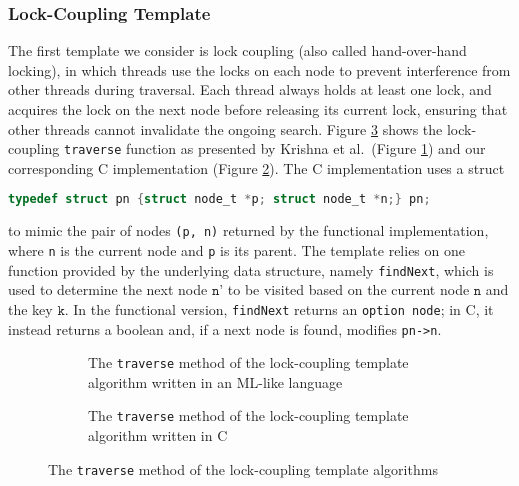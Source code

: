\documentclass[a4paper,UKenglish,cleveref, autoref, thm-restate]{lipics-v2021}
\begin{document}
\subsubsection{Lock-Coupling Template}
\label{lock-coupling-algo}

The first template we consider is lock coupling (also called hand-over-hand locking), in which threads use the locks on each node to prevent interference from other threads during traversal. Each thread always holds at least one lock, and acquires the lock on the next node before releasing its current lock, ensuring that other threads cannot invalidate the ongoing search.
Figure \ref{traverse_lock} shows the lock-coupling \lstinline{traverse} function as presented by Krishna et al.~(Figure \ref{traverse_lock_a}) and our corresponding C implementation (Figure \ref{traverse_lock_b}). The C implementation uses a struct
\begin{lstlisting}[language = C, backgroundcolor=\color{white}, basicstyle=\ttfamily\footnotesize]
typedef struct pn {struct node_t *p; struct node_t *n;} pn;
\end{lstlisting}
to mimic the pair of nodes \lstinline{(p, n)} returned by the functional implementation, where \lstinline{n} is the current node and \lstinline{p} is its parent. The template relies on one function provided by the underlying data structure, namely \lstinline{findNext}, which is used to determine the next node $\texttt{n'}$ to be visited based on the current node $\texttt{n}$ and the key $\texttt{k}$. In the functional version, \lstinline{findNext} returns an \lstinline{option node}; in C, it instead returns a boolean and, if a next node is found, modifies \lstinline{pn->n}.


\begin{figure}[ht]
	\begin{subfigure}[t]{0.45\textwidth}
		 
		\caption{The \lstinline{traverse} method of the lock-coupling template algorithm written in an ML-like language \cite{krishna2019compositional}} 
		\label{traverse_lock_a}	
	\end{subfigure}\qquad
	\begin{subfigure}[t]{0.48\textwidth}
		 
		\caption{The \lstinline{traverse} method of the lock-coupling template algorithm written in C}
		\label{traverse_lock_b}
	\end{subfigure}
	\caption{The \lstinline{traverse} method of the lock-coupling template algorithms}
	\label{traverse_lock}
\end{figure}
\end{document}
